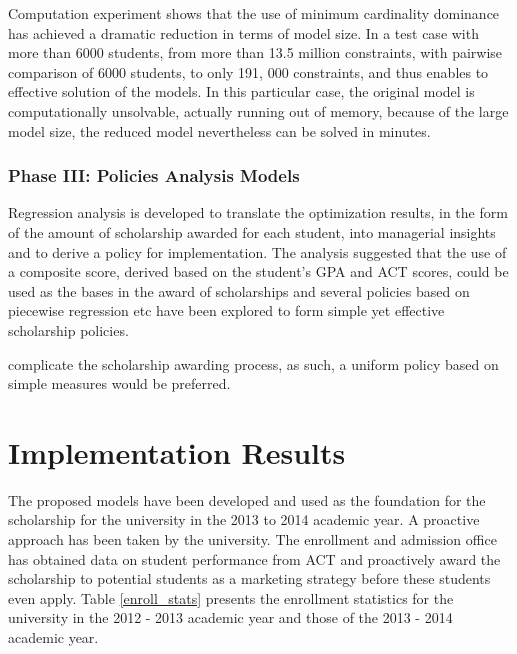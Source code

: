 \documentclass[12pt,english]{report}
\begin{document}
Computation experiment shows that the use of minimum cardinality dominance has
achieved a dramatic reduction in terms of model size. In a test case with more
than 6000 students,  from more than 13.5 million constraints, with pairwise
comparison of 6000 students, to only 191, 000 constraints, and thus enables to
effective solution of the models.   In this particular case,  the original
model is computationally unsolvable, actually running out of memory, because of
the large model size,  the reduced model nevertheless can be solved in minutes.

\subsubsection{Phase III: Policies Analysis Models}
Regression analysis is developed to translate the optimization results, in the
form of the  amount of scholarship awarded for each student, into managerial
insights and to derive a policy for implementation.  The analysis suggested that
the use of a composite score, derived based on the student's GPA and ACT
scores, could be used as the bases in the award of scholarships and several
policies based on piecewise regression etc have been explored to form simple
yet effective scholarship policies.

complicate the scholarship awarding process, as such, a uniform policy based on
simple measures would be preferred.

\section{Implementation Results}
The proposed models have been developed and used as the foundation for the
scholarship for the university in the 2013 to 2014 academic year.  A proactive
approach has been taken by the university. The enrollment and admission office
has obtained data on student performance from ACT and proactively award the
scholarship to potential students as a marketing strategy before these students
even apply. Table \ref{enroll_stats} presents the enrollment statistics for the
university in the 2012 - 2013 academic year and those of the 2013 - 2014
academic year.
\end{document}
